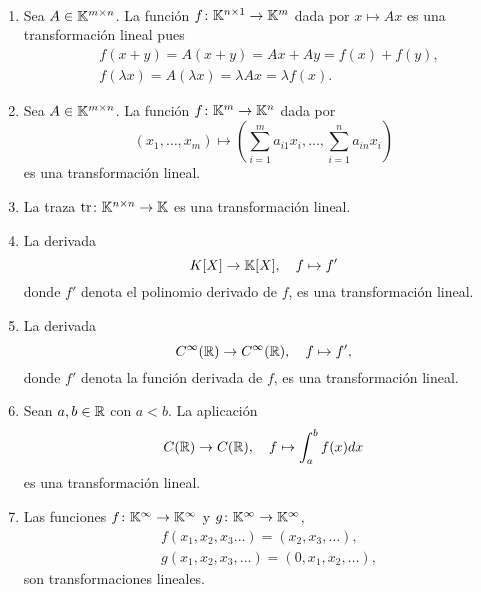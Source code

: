 \begin{examples}\
    \begin{enumerate}
        \item Sea $A\in\mathbb{K}^{m\times n}$. La función $f\colon\mathbb{K}^{n\times1}\to\mathbb{K}^m$ dada
            por $x\mapsto Ax$ es una transformación lineal pues
            \begin{align*}
                &f(x+y)=A(x+y)=Ax+Ay=f(x)+f(y),\\
                &f(\lambda x)=A(\lambda x)=\lambda Ax=\lambda f(x).
            \end{align*}
        \item Sea $A\in\mathbb{K}^{m\times n}$. La función $f\colon\mathbb{K}^{m}\to\mathbb{K}^n$ dada por
            \[
                (x_1,\dots,x_m)\mapsto \left(\sum_{i=1}^m a_{i1}x_i,\dots,\sum_{i=1}^n a_{in}x_i\right)
            \]
            es una transformación lineal. 
        \item La traza $\operatorname{tr}\colon\mathbb{K}^{n\times n}\to\mathbb{K}$ es una transformación
            lineal.
        \item La derivada 
            \[
            K[X]\to\mathbb{K}[X],\quad
                f\mapsto f'
            \]
            donde $f'$ denota el polinomio derivado de $f$, 
            es una transformación lineal. 
        \item La derivada 
            \[
                C^{\infty}(\mathbb{R})\to C^{\infty}(\mathbb{R}), \quad
                f\mapsto f',
            \]
            donde $f'$ denota la función derivada de $f$, es una transformación
            lineal.
        \item Sean $a,b\in\mathbb{R}$ con $a<b$. La aplicación 
            \[
                C(\mathbb{R})\to C(\mathbb{R}), \quad 
                f\mapsto\int_{a}^{b}f(x)dx
            \]
            es una transformación lineal.
		\item Las funciones $f\colon\mathbb{K}^{\infty}\to\mathbb{K}^{\infty}$ y $g\colon\mathbb{K}^{\infty}\to\mathbb{K}^{\infty}$, 
			\begin{align*}
            &f(x_1,x_2,x_3\dots)=(x_2,x_3,\dots),\\
			&g(x_1,x_2,x_3,\dots)=(0,x_1,x_2,\dots),
			\end{align*}
            son transformaciones lineales.
    \end{enumerate}
\end{examples}

